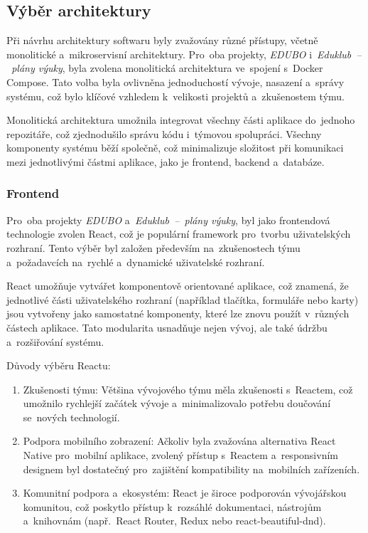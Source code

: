 \documentclass[male,czech,api_bc]{kitheses}
\begin{document}
\subsection{Výběr architektury}

Při návrhu architektury softwaru byly zvažovány různé přístupy, včetně monolitické a~mikroservisní architektury. Pro~oba projekty, \textit{EDUBO} i~\textit{Eduklub~--~plány výuky}, byla zvolena monolitická architektura ve~spojení s~Docker Compose. Tato volba byla ovlivněna jednoduchostí vývoje, nasazení a~správy systému, což bylo klíčové vzhledem k~velikosti projektů a~zkušenostem týmu.

Monolitická architektura umožnila integrovat všechny části aplikace do~jednoho repozitáře, což zjednodušilo správu kódu i~týmovou spolupráci. Všechny komponenty systému běží společně, což minimalizuje složitost při komunikaci mezi jednotlivými částmi aplikace, jako je frontend, backend a~databáze.

\subsubsection{Frontend}

Pro~oba projekty \textit{EDUBO} a~\textit{Eduklub~--~plány výuky}, byl jako frontendová technologie zvolen React, což je populární framework pro~tvorbu uživatelských rozhraní. Tento výběr byl založen především na~zkušenostech týmu a~požadavcích na~rychlé a~dynamické uživatelské rozhraní.

React umožňuje vytvářet komponentově orientované aplikace, což znamená, že jednotlivé části uživatelského rozhraní (například tlačítka, formuláře nebo karty) jsou vytvořeny jako samostatné komponenty, které lze znovu použít v~různých částech aplikace. Tato modularita usnadňuje nejen vývoj, ale také údržbu a~rozšiřování systému.

Důvody výběru Reactu:
\begin{enumerate}
	\item Zkušenosti týmu: Většina vývojového týmu měla zkušenosti s~Reactem, což umožnilo rychlejší začátek vývoje a~minimalizovalo potřebu doučování se~nových technologií.
	\item Podpora mobilního zobrazení: Ačkoliv byla zvažována alternativa React Native pro~mobilní aplikace, zvolený přístup s~Reactem a~responsivním designem byl dostatečný pro~zajištění kompatibility na~mobilních zařízeních.
	\item Komunitní podpora a~ekosystém: React je široce podporován vývojářskou komunitou, což poskytlo přístup k~rozsáhlé dokumentaci, nástrojům a~knihovnám (např.~React Router, Redux nebo react-beautiful-dnd).
\end{enumerate}
\end{document}
